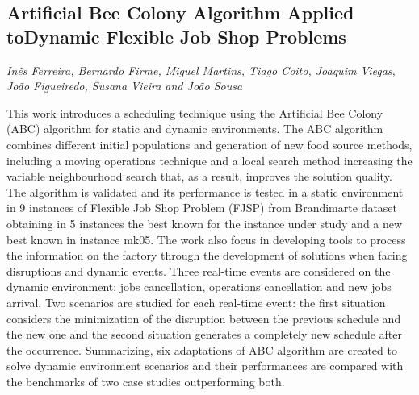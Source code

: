 \documentclass[../booklet.tex]{subfiles}
\begin{document}
\subsection[Artificial Bee Colony Algorithm Applied toDynamic Flexible Job Shop Problems. {\it Inês Ferreira, Bernardo Firme, Miguel Martins, Tiago Coito, Joaquim Viegas, João Figueiredo, Susana Vieira and João Sousa}]{Artificial Bee Colony Algorithm Applied toDynamic Flexible Job Shop Problems}
       

\begin{center}
  {\it Inês Ferreira, Bernardo Firme, Miguel Martins, Tiago Coito, Joaquim Viegas, João Figueiredo, Susana Vieira and João Sousa}
\end{center}



This work introduces a scheduling technique using the Artificial Bee Colony (ABC) algorithm for static and dynamic environments.
The ABC algorithm combines different initial populations and generation of new food source methods, including a moving operations technique and a local search method increasing the variable neighbourhood search that, as a result, improves the solution quality. The algorithm is validated and its performance is tested in a static environment in 9 instances of Flexible Job Shop Problem (FJSP) from Brandimarte dataset obtaining in 5 instances the best known for the instance under study and a new best known in instance mk05.  
The work also focus in developing tools to process the information on the factory through the development of solutions when facing disruptions and dynamic events. Three real-time events are considered on the dynamic environment: jobs cancellation, operations cancellation and new jobs arrival. Two scenarios are studied for each real-time event: the first situation considers the minimization of the disruption between the previous schedule and the new one and the second situation generates a completely new schedule after the occurrence. Summarizing, six adaptations of ABC algorithm are created to solve dynamic environment scenarios and their performances are compared with the benchmarks of two case studies outperforming both. 

\end{document}
